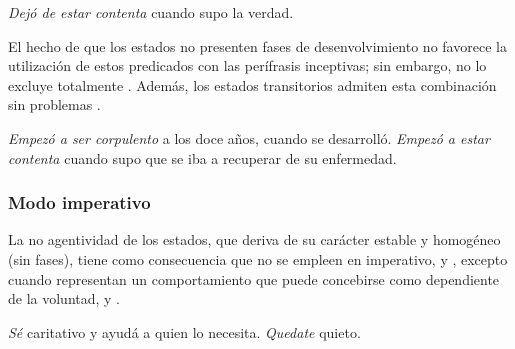 \begin{exe}
  \ex
    \begin{xlist}
      \ex\label{ex:08-contenta-b} \textit{Dejó de estar contenta} cuando supo la
          verdad.
    \end{xlist}
\end{exe}

El hecho de que los estados no presenten fases de desenvolvimiento no favorece
la utilización de estos predicados con las perífrasis inceptivas; sin embargo,
no lo excluye totalmente . Además, los estados
transitorios admiten esta combinación sin problemas .

\begin{exe}
  \ex\label{ex:08-corpulento} \textit{Empezó a ser corpulento} a los doce años,
      cuando se desarrolló.
  \ex\label{ex:08-recuperar} \textit{Empezó a estar contenta} cuando supo que se
      iba a recuperar de su enfermedad.
\end{exe}

\subsubsection{Modo imperativo}\label{sec:08-imperativo}

La no agentividad de los estados, que deriva de su carácter estable y homogéneo
(sin fases), tiene como consecuencia que no se empleen en imperativo,
 y , excepto cuando representan un
comportamiento que puede concebirse como dependiente de la voluntad,
 y .

\begin{exe}
  \ex\label{ex:08-caritativo} \textit{Sé} caritativo y ayudá a quien lo necesita.
  \ex\label{ex:08-quieto} \textit{Quedate} quieto.
\end{exe}

